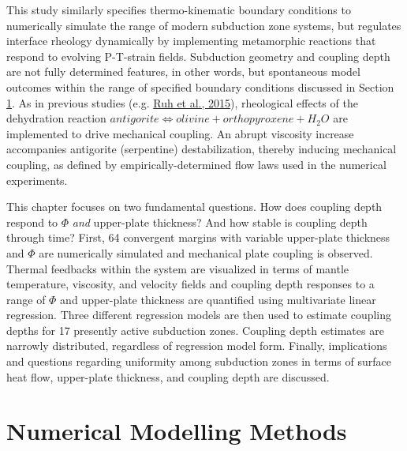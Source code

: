 This study similarly specifies thermo-kinematic boundary conditions to numerically simulate the range of modern subduction zone systems, but regulates interface rheology dynamically by implementing metamorphic reactions that respond to evolving P-T-strain fields. Subduction geometry and coupling depth are not fully determined features, in other words, but spontaneous model outcomes within the range of specified boundary conditions discussed in Section \ref{numMethods}. As in previous studies (e.g. \protect\hyperlink{ref-ruh2015}{Ruh et al., 2015}), rheological effects of the dehydration reaction \(antigorite \allowbreak \Leftrightarrow olivine + orthopyroxene + H_{2}O\) are implemented to drive mechanical coupling. An abrupt viscosity increase accompanies antigorite (serpentine) destabilization, thereby inducing mechanical coupling, as defined by empirically-determined flow laws used in the numerical experiments.

This chapter focuses on two fundamental questions. How does coupling depth respond to \(\Phi\) \emph{and} upper-plate thickness? And how stable is coupling depth through time? First, 64 convergent margins with variable upper-plate thickness and \(\Phi\) are numerically simulated and mechanical plate coupling is observed. Thermal feedbacks within the system are visualized in terms of mantle temperature, viscosity, and velocity fields and coupling depth responses to a range of \(\Phi\) and upper-plate thickness are quantified using multivariate linear regression. Three different regression models are then used to estimate coupling depths for 17 presently active subduction zones. Coupling depth estimates are narrowly distributed, regardless of regression model form. Finally, implications and questions regarding uniformity among subduction zones in terms of surface heat flow, upper-plate thickness, and coupling depth are discussed.

\hypertarget{numMethods}{%
\section{Numerical Modelling Methods}\label{numMethods}}

